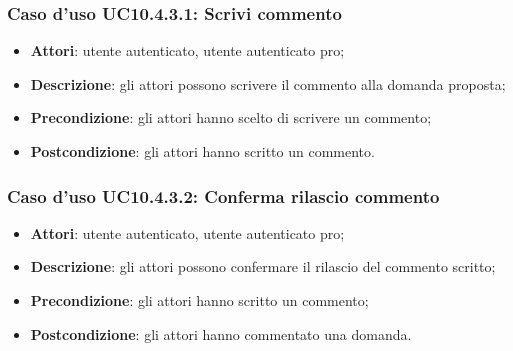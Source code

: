 \subsubsection{Caso d'uso UC10.4.3.1: Scrivi commento}
	\begin{itemize}
		\item \textbf{Attori}: utente autenticato, utente autenticato pro;
		\item \textbf{Descrizione}: gli attori possono scrivere il commento alla domanda proposta;
		\item \textbf{Precondizione}: gli attori hanno scelto di scrivere un commento;
		\item \textbf{Postcondizione}: gli attori hanno scritto un commento.
	\end{itemize}
\subsubsection{Caso d'uso UC10.4.3.2: Conferma rilascio commento}
	\begin{itemize}
		\item \textbf{Attori}: utente autenticato, utente autenticato pro;
		\item \textbf{Descrizione}: gli attori possono confermare il rilascio del commento scritto;
		\item \textbf{Precondizione}: gli attori hanno scritto un commento;
		\item \textbf{Postcondizione}: gli attori hanno commentato una domanda.
	\end{itemize}
